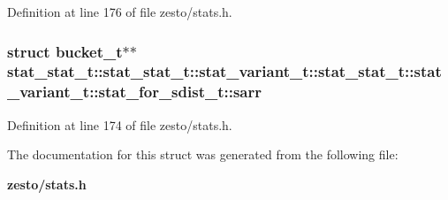 Definition at line 176 of file zesto/stats.h.
\subsubsection[{sarr}]{\setlength{\rightskip}{0pt plus 5cm}struct {\bf bucket\_\-t}$\ast$$\ast$ stat\_\-stat\_\-t::stat\_\-stat\_\-t::stat\_\-variant\_\-t::stat\_\-stat\_\-t::stat\_\-variant\_\-t::stat\_\-for\_\-sdist\_\-t::sarr\hspace{0.3cm}{\tt  [read]}}\label{structstat__stat__t_1_1stat__variant__t_1_1stat__for__sdist__t_2b5c4eab32f9b5f9768b0502a4282971}




Definition at line 174 of file zesto/stats.h.

The documentation for this struct was generated from the following file:\begin{CompactItemize}
\item 
{\bf zesto/stats.h}\end{CompactItemize}
